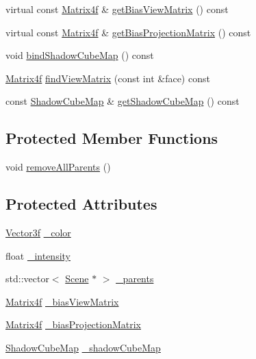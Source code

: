 \begin{DoxyCompactItemize}
virtual const \hyperlink{namespaceburn_a643e9d2ffceb4304e3755a100268a7a3}{Matrix4f} \& \hyperlink{classburn_1_1_light_af08ea0337d85542b856662d3fc78453b}{get\-Bias\-View\-Matrix} () const 
\item 
virtual const \hyperlink{namespaceburn_a643e9d2ffceb4304e3755a100268a7a3}{Matrix4f} \& \hyperlink{classburn_1_1_light_a2e9ec371a39bb44d98892b4076cc4766}{get\-Bias\-Projection\-Matrix} () const 
\item 
void \hyperlink{classburn_1_1_light_a39e25024015dd3dc1668300d1807a189}{bind\-Shadow\-Cube\-Map} () const 
\item 
\hyperlink{namespaceburn_a643e9d2ffceb4304e3755a100268a7a3}{Matrix4f} \hyperlink{classburn_1_1_light_a601abfc3e38f459fcad0f0ceb1e71df2}{find\-View\-Matrix} (const int \&face) const 
\item 
const \hyperlink{classburn_1_1_shadow_cube_map}{Shadow\-Cube\-Map} \& \hyperlink{classburn_1_1_light_a01d43c41e03e7ec0f3ec37281a1cf920}{get\-Shadow\-Cube\-Map} () const 
\end{DoxyCompactItemize}
\subsection*{Protected Member Functions}
\begin{DoxyCompactItemize}
\item 
void \hyperlink{classburn_1_1_light_a5fce7c28e34206c39645bb383b823f48}{remove\-All\-Parents} ()
\end{DoxyCompactItemize}
\subsection*{Protected Attributes}
\begin{DoxyCompactItemize}
\item 
\hyperlink{namespaceburn_afdd7cfb352b9612432faf6947b6fff74}{Vector3f} \hyperlink{classburn_1_1_light_a6a49b033b4c1cb79e3d84e9ef74dbcda}{\-\_\-color}
\item 
float \hyperlink{classburn_1_1_light_a92fcb1a0d7bf3680d65108b59931658b}{\-\_\-intensity}
\item 
std\-::vector$<$ \hyperlink{classburn_1_1_scene}{Scene} $\ast$ $>$ \hyperlink{classburn_1_1_light_a33188aef471ba7c742c004a787c5a8b4}{\-\_\-parents}
\item 
\hyperlink{namespaceburn_a643e9d2ffceb4304e3755a100268a7a3}{Matrix4f} \hyperlink{classburn_1_1_light_a58333b9fd0fc2bf4e0cba73097b8e5c9}{\-\_\-bias\-View\-Matrix}
\item 
\hyperlink{namespaceburn_a643e9d2ffceb4304e3755a100268a7a3}{Matrix4f} \hyperlink{classburn_1_1_light_a18f86434a088d060af651fc1a2394cdf}{\-\_\-bias\-Projection\-Matrix}
\item 
\hyperlink{classburn_1_1_shadow_cube_map}{Shadow\-Cube\-Map} \hyperlink{classburn_1_1_light_af06e39faf3bc51663bc2f0e0302bd0d0}{\-\_\-shadow\-Cube\-Map}
\end{DoxyCompactItemize}


